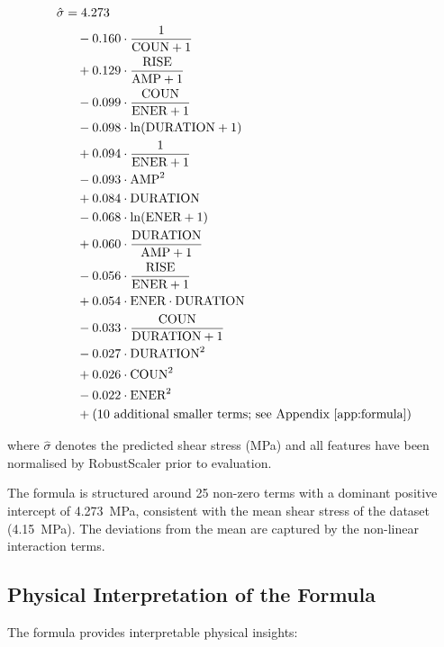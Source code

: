 \documentclass[12pt,a4paper]{article}
\begin{document}
\begin{align}
  \hat{\sigma} &= 4.273 \notag\\
  &\quad - 0.160 \cdot \frac{1}{\text{COUN}+1} \notag\\
  &\quad + 0.129 \cdot \frac{\text{RISE}}{\text{AMP}+1} \notag\\
  &\quad - 0.099 \cdot \frac{\text{COUN}}{\text{ENER}+1} \notag\\
  &\quad - 0.098 \cdot \ln(\text{DURATION}+1) \notag\\
  &\quad + 0.094 \cdot \frac{1}{\text{ENER}+1} \notag\\
  &\quad - 0.093 \cdot \text{AMP}^{2} \notag\\
  &\quad + 0.084 \cdot \text{DURATION} \notag\\
  &\quad - 0.068 \cdot \ln(\text{ENER}+1) \notag\\
  &\quad + 0.060 \cdot \frac{\text{DURATION}}{\text{AMP}+1} \notag\\
  &\quad - 0.056 \cdot \frac{\text{RISE}}{\text{ENER}+1} \notag\\
  &\quad + 0.054 \cdot \text{ENER} \cdot \text{DURATION} \notag\\
  &\quad - 0.033 \cdot \frac{\text{COUN}}{\text{DURATION}+1} \notag\\
  &\quad - 0.027 \cdot \text{DURATION}^{2} \notag\\
  &\quad + 0.026 \cdot \text{COUN}^{2} \notag\\
  &\quad - 0.022 \cdot \text{ENER}^{2} \notag\\
  &\quad + \text{(10 additional smaller terms; see Appendix~\ref{app:formula})}
  \label{eq:sr_formula}
\end{align}

\noindent where $\hat{\sigma}$ denotes the predicted shear stress (MPa) and all
features have been normalised by RobustScaler prior to evaluation.

The formula is structured around 25 non-zero terms with a dominant positive
intercept of 4.273~MPa, consistent with the mean shear stress of the dataset
(4.15~MPa). The deviations from the mean are captured by the non-linear
interaction terms.

\subsection{Physical Interpretation of the Formula}
\label{subsec:physics}

The formula provides interpretable physical insights:
\end{document}

